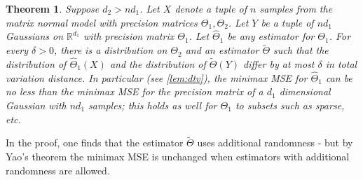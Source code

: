 \documentclass[aos]{imsart}
\newtheorem{theorem}{Theorem}[section]
\theoremstyle{definition}
\numberwithin{equation}{section}
\newcommand{\R}{{\mathbb{R}}}
\newcommand{\CF}[1]{{\color{purple}[CF: #1]}}
\begin{document}
\begin{theorem}Suppose $d_2 > n d_1$. Let $X$ denote a tuple of $n$ samples from the matrix normal model with precision matrices $\Theta_1, \Theta_2$. Let $Y$ be a tuple of $nd_1$ Gaussians on $\R^{d_1}$ with precision matrix $\Theta_1$. Let $\widehat{\Theta}_1$ be any estimator for $\Theta_1$. For every $\delta > 0$, there is a distribution on $\Theta_2$ and an estimator $\tilde{\Theta}$ such that the distribution of $\widehat{\Theta}_1(X)$ and the distribution of $\tilde{\Theta}(Y)$ differ by at most $\delta$ in total variation distance. In particular (see \cref{lem:dtv}), the minimax MSE for $\widehat{\Theta}_1$ can be no less than the minimax MSE for the precision matrix of a $d_1$ dimensional Gaussian with $nd_1$ samples; this holds as well for $\Theta_1$ to subsets such as sparse, etc. %
\end{theorem}
In the proof, one finds that the estimator $\tilde{\Theta}$ uses additional randomness - but by Yao's theorem the minimax MSE is unchanged when estimators with additional randomness are allowed.
\end{document}
